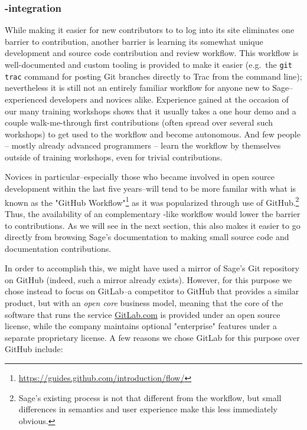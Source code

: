 \hypertarget{gitlab-trac-integration}{%
\subsubsection{\GitLab-\Trac integration}\label{gitlab-trac-integration}}

While making it easier for new contributors to \Sage to log into its \Trac site
eliminates one barrier to contribution, another barrier is learning its
somewhat unique development and source code contribution and review workflow.  This
workflow is well-documented and custom tooling is provided to make it easier
(e.g.~the {\tt git trac} command for posting Git branches directly to Trac
from the command line); nevertheless it is still not an entirely familiar workflow for
anyone new to Sage--experienced developers and novices alike.
%
Experience gained at the occasion of our many training workshops shows
that it usually takes a one hour demo and a couple walk-me-through
first contributions (often spread over several such workshops) to get
used to the workflow and become autonomous. And few people -- mostly
already advanced programmers -- learn the workflow by themselves
outside of training workshops, even for trivial contributions.

Novices in particular--especially those who became involved in open source
development within the last five years--will tend to be more familar with what
is known as the "GitHub
Workflow"\footnote{\url{https://guides.github.com/introduction/flow/}} as it
was popularized through use of GitHub.\footnote{Sage's existing process is not that different from
the \GitHub workflow, but small differences in semantics and user experience
make this less immediately obvious.} Thus, the availability of
an complementary \GitHub-like workflow would lower the barrier
to contributions.  As we will see in the next section, this
also makes it easier to go directly from browsing Sage's documentation to
making small source code and documentation contributions.

In order to accomplish this, we might have used a mirror of Sage's Git
repository on GitHub (indeed, such a mirror already exists).  However, for this
purpose we chose instead to focus on GitLab--a competitor to GitHub that
provides a similar product, but with an {\em open core} business model, meaning
that the core of the software that runs the service \url{GitLab.com} is provided under an open source
license, while the company maintains optional "enterprise" features under a
separate proprietary license.  A few reasons we chose GitLab for this purpose
over GitHub include:

